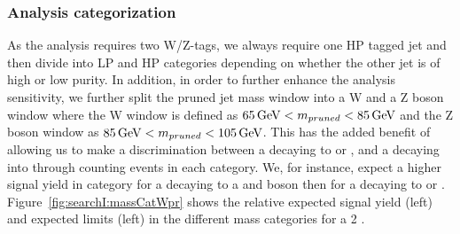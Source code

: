 \subsubsection{Analysis categorization}
As the analysis requires two W/Z-tags, we always require one HP tagged jet and then divide into LP and HP categories depending on whether the other jet is of high or low purity. In addition, in order to further enhance the analysis sensitivity, we further split the pruned jet mass window into a W and a Z boson window where the W window is defined as $65 {\,\text{Ge\hspace{-.08em}V}} < m_{pruned} < 85 {\,\text{Ge\hspace{-.08em}V}}$ and the Z boson window as $85 {\,\text{Ge\hspace{-.08em}V}} < m_{pruned} < 105 {\,\text{Ge\hspace{-.08em}V}}$. This has the added benefit of allowing us to make a discrimination between a \BulkG decaying to \WW or \ZZ, and a \PWpr decaying into \WZ through counting events in each category. We, for instance, expect a higher signal yield in \WZ category for a \PWpr decaying to a \PW and \PZ boson then for a \BulkG decaying to \WW or \ZZ. Figure~\ref{fig:searchI:massCatWpr} shows the relative expected signal yield (left) and expected limits (left) in the different mass categories for a 2 \TeV \PWpr.
 
